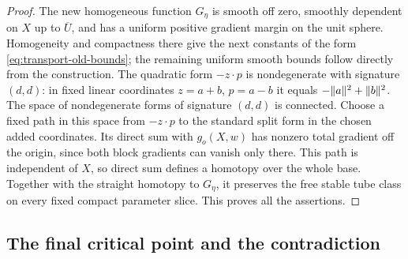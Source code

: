 \begin{proof}
The new homogeneous function $G_\eta$ is smooth off zero, smoothly
dependent on $X$ up to $\overline U$, and has a uniform positive
gradient margin on the unit sphere.  Homogeneity and compactness
there give the next constants of the form
\eqref{eq:transport-old-bounds}; the remaining uniform smooth bounds
follow directly from the construction.  The quadratic form
$-z\cdot p$ is nondegenerate with signature $(d,d)$: in fixed linear
coordinates $z=a+b$, $p=a-b$ it equals $-\lVert a\rVert^2+\lVert b\rVert^2$.
The space of nondegenerate forms of signature $(d,d)$ is connected.
Choose a fixed path in this space from $-z\cdot p$ to the standard
split form in the chosen added coordinates. Its direct sum with
$g_o(X,w)$ has nonzero total gradient off the origin, since both block
gradients can vanish only there. This path is independent of $X$, so
direct sum defines a homotopy over the whole base. Together with the
straight homotopy to $G_\eta$, it preserves the free stable tube class
on every fixed compact parameter slice.
This proves all the assertions.
\end{proof}

\subsection{The final critical point and the contradiction}

